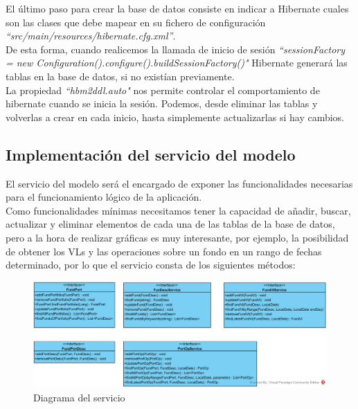 \documentclass[12pt, a4paper]{article}
\begin{document}
 El último paso para crear la base de datos consiste en indicar a Hibernate cuales son las clases que debe mapear en su fichero de configuración \textit{``src/main/resources/hibernate.cfg.xml''}.\\
 
  De esta forma, cuando realicemos la llamada de inicio de sesión \textit{``sessionFactory = new Configuration().configure().buildSessionFactory()"} Hibernate generará las tablas en la base de datos, si no existían previamente.\\
 
  La propiedad \textit{``hbm2ddl.auto"} nos permite controlar el comportamiento de hibernate cuando se inicia la sesión. Podemos, desde eliminar las tablas y volverlas a crear en cada inicio, hasta simplemente actualizarlas si hay cambios.

\newpage

\subsection{Implementación del servicio del modelo}

El servicio del modelo será el encargado de exponer las funcionalidades necesarias para el funcionamiento lógico de la aplicación.\\

Como funcionalidades mínimas necesitamos tener la capacidad de añadir, buscar, actualizar y eliminar elementos de cada una de las tablas de la base de datos, pero a la hora de realizar gráficas es muy interesante, por ejemplo, la posibilidad de obtener los \gls{VL}s y las operaciones sobre un fondo en un rango de fechas determinado, por lo que el servicio consta de los siguientes métodos:\\

\begin{figure}[htbp]
	\centering
	\includegraphics[width=\textwidth]{figuras/Diagrama_Modelo.png}
	\caption{Diagrama del servicio}
	\label{fig:relacional}
	\end {figure}
\end{document}

